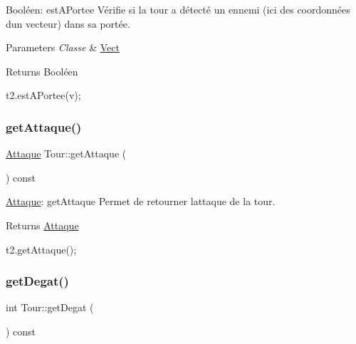 Booléen\+: est\+A\+Portee Vérifie si la tour a détecté un ennemi (ici des coordonnées d\textquotesingle{}un vecteur) dans sa portée. 


\begin{DoxyParams}{Parameters}
{\em Classe} & \hyperlink{classVect}{Vect} \\
\hline
\end{DoxyParams}
\begin{DoxyReturn}{Returns}
Booléen 
\begin{DoxyCode}
t2.estAPortee(v);
\end{DoxyCode}
 
\end{DoxyReturn}
\mbox{\label{classTour_adba4672afe3b3c71689f3303007caa59}} 
\subsubsection{\texorpdfstring{get\+Attaque()}{getAttaque()}}
{\footnotesize\ttfamily \hyperlink{classAttaque}{Attaque} Tour\+::get\+Attaque (\begin{DoxyParamCaption}{ }\end{DoxyParamCaption}) const}



\hyperlink{classAttaque}{Attaque}\+: get\+Attaque Permet de retourner l\textquotesingle{}attaque de la tour. 

\begin{DoxyReturn}{Returns}
\hyperlink{classAttaque}{Attaque} 
\begin{DoxyCode}
t2.getAttaque();
\end{DoxyCode}
 
\end{DoxyReturn}
\mbox{\label{classTour_a029767fb4e9eb78f8f9d3f1d824281a0}} 
\subsubsection{\texorpdfstring{get\+Degat()}{getDegat()}}
{\footnotesize\ttfamily int Tour\+::get\+Degat (\begin{DoxyParamCaption}{ }\end{DoxyParamCaption}) const}



